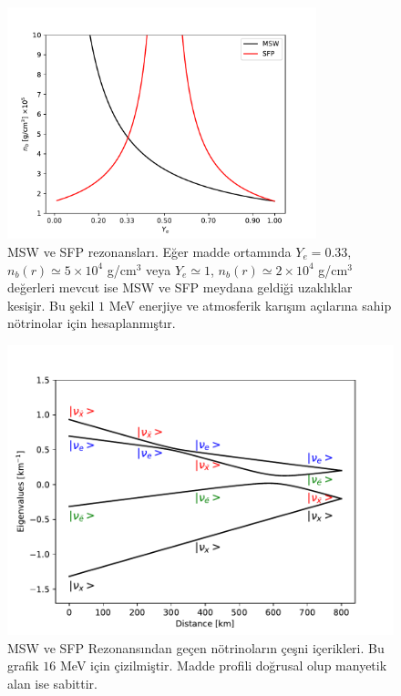 \begin{figure}[hbt!]
	\centering
	\includegraphics[width=0.8\textwidth]{figures/resonance_nb_Ye.pdf}
	\caption[MSW ve SFP rezonansları]{MSW ve SFP rezonansları. Eğer madde ortamında $ Y_e = 0.33 $, $n_{b}(r) \simeq 5 \times 10^{4} $ g/cm$^{3}$ veya $ Y_e \simeq 1 $, $n_{b}(r) \simeq 2	\times 10^{4} $ g/cm$^{3}$ değerleri mevcut ise MSW ve SFP meydana geldiği uzaklıklar kesişir. Bu şekil $ 1 $ MeV enerjiye ve atmosferik karışım açılarına sahip nötrinolar için hesaplanmıştır. }
	\label{fig:resonance_nb_Ye}
\end{figure}
\begin{figure}[hbt!]
	\centering
	\includegraphics[width=\textwidth]{figures/constant_B_linear_V_flavorContent_16_MeV.pdf}
	\caption[MSW ve SFP Rezonansından geçen nötrinoların çeşni içerikleri]{MSW ve SFP Rezonansından geçen nötrinoların çeşni içerikleri. Bu grafik $ 16 $ MeV için çizilmiştir. Madde profili doğrusal olup manyetik alan ise sabittir.}
	\label{fig:simpleCaseSemiAdiabFlavContent}
  \end{figure}
